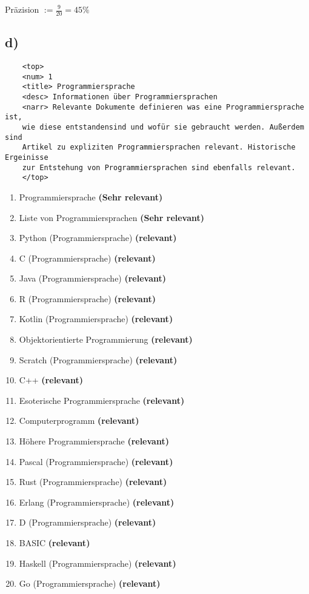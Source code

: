 \documentclass[11pt,a4paper,parskip=half ]{scrartcl}
\begin{document}
	Präzision $:= \frac{9}{20} = 45\% $
	
	\subsection*{d)}
	\begin{verbatim}
	<top> 
	<num> 1
	<title> Programmiersprache
	<desc> Informationen über Programmiersprachen 
	<narr> Relevante Dokumente definieren was eine Programmiersprache ist, 
	wie diese entstandensind und wofür sie gebraucht werden. Außerdem sind 
	Artikel zu expliziten Programmiersprachen relevant. Historische Ergeinisse 
	zur Entstehung von Programmiersprachen sind ebenfalls relevant.
	</top>	
	\end{verbatim}
	
	\begin{enumerate}
		\item Programmiersprache \textbf{(Sehr relevant)}
		\item Liste von Programmiersprachen \textbf{(Sehr relevant)}
		\item Python (Programmiersprache)  \textbf{(relevant)}
		\item C (Programmiersprache)  \textbf{(relevant)}
		\item Java (Programmiersprache)  \textbf{(relevant)}
		\item R (Programmiersprache)  \textbf{(relevant)}
		\item Kotlin (Programmiersprache)  \textbf{(relevant)}
		\item Objektorientierte Programmierung   \textbf{(relevant)}
		\item Scratch (Programmiersprache)  \textbf{(relevant)}
		\item C++   \textbf{(relevant)}
		\item Esoterische Programmiersprache  \textbf{(relevant)}
		\item Computerprogramm   \textbf{(relevant)}
		\item Höhere Programmiersprache  \textbf{(relevant)}
		\item Pascal (Programmiersprache)  \textbf{(relevant)}
		\item Rust (Programmiersprache) \textbf{(relevant)}
		\item Erlang (Programmiersprache)  \textbf{(relevant)}
		\item D (Programmiersprache)  \textbf{(relevant)}
		\item BASIC  \textbf{(relevant)}
		\item Haskell (Programmiersprache)  \textbf{(relevant)}
		\item Go (Programmiersprache)  \textbf{(relevant)}
	\end{enumerate}
	
\end{document}
